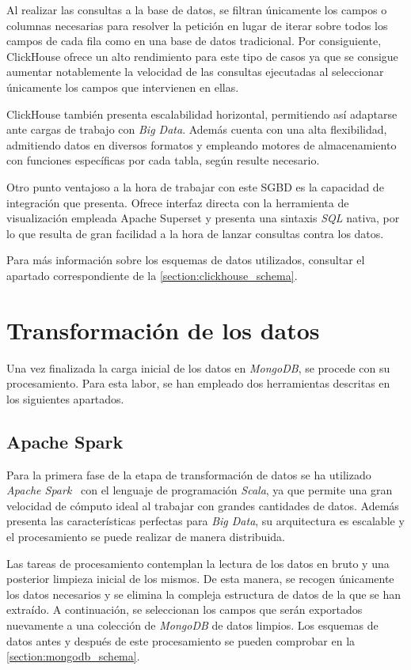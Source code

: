 Al realizar las consultas a la base de datos, se filtran únicamente los campos o columnas necesarias para resolver la petición en lugar de iterar sobre todos los campos de cada fila como en una base de datos tradicional. Por consiguiente, ClickHouse ofrece un alto rendimiento para este tipo de casos ya que se consigue aumentar notablemente la velocidad de las consultas ejecutadas al seleccionar únicamente los campos que intervienen en ellas.

ClickHouse también presenta escalabilidad horizontal, permitiendo así adaptarse ante cargas de trabajo con \textit{Big Data}. Además cuenta con una alta flexibilidad, admitiendo datos en diversos formatos y empleando motores de almacenamiento con funciones específicas por cada tabla, según resulte necesario.

Otro punto ventajoso a la hora de trabajar con este SGBD es la capacidad de integración que presenta. Ofrece interfaz directa con la herramienta de visualización empleada Apache Superset y presenta una sintaxis \textit{SQL} nativa, por lo que resulta de gran facilidad a la hora de lanzar consultas contra los datos.

Para más información sobre los esquemas de datos utilizados, consultar el apartado correspondiente de la \autoref{section:clickhouse_schema}.


\section{Transformación de los datos}

Una vez finalizada la carga inicial de los datos en \textit{MongoDB}, se procede con su procesamiento. Para esta labor, se han empleado dos herramientas descritas en los siguientes apartados.

\subsection{Apache Spark}

Para la primera fase de la etapa de transformación de datos se ha utilizado \textit{Apache Spark}~\cite{apacheSpark} con el lenguaje de programación \textit{Scala}, ya que permite una gran velocidad de cómputo ideal al trabajar con grandes cantidades de datos. Además presenta las características perfectas para \textit{Big Data}, su arquitectura es escalable y el procesamiento se puede realizar de manera distribuida.

Las tareas de procesamiento contemplan la lectura de los datos en bruto y una posterior limpieza inicial de los mismos. De esta manera, se recogen únicamente los datos necesarios y se elimina la compleja estructura de datos de la que se han extraído. A continuación, se seleccionan los campos que serán exportados nuevamente a una colección de \textit{MongoDB} de datos limpios. Los esquemas de datos antes y después de este procesamiento se pueden comprobar en la \autoref{section:mongodb_schema}.

